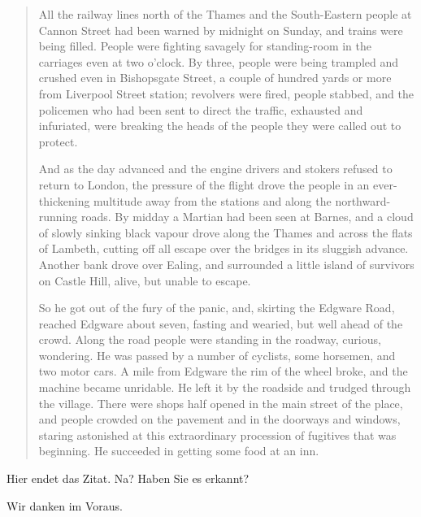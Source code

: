 \documentclass[12pt,ngerman,latin9,a4paper]{g-brief-ntz39lg19_exp}
\begin{document}
\begin{g-brief}
\begin{quote}
All the railway lines north of the Thames and the South-Eastern people at Cannon Street had been warned by midnight on Sunday, and trains were being filled.  People were fighting savagely for standing-room in the carriages even at two o'clock.  By three, people were being trampled and crushed even in Bishopsgate Street, a couple of hundred yards or more from Liverpool Street station; revolvers were fired, people stabbed, and the policemen who had been sent to direct the traffic, exhausted and infuriated, were breaking the heads of the people they were called out to protect.

And as the day advanced and the engine drivers and stokers refused to return to London, the pressure of the flight drove the people in an ever-thickening multitude away from the stations and along the northward-running roads.  By midday a Martian had been seen at Barnes, and a cloud of slowly sinking black vapour drove along the Thames and across the flats of Lambeth, cutting off all escape over the bridges in its sluggish advance.  Another bank drove over Ealing, and surrounded a little island of survivors on Castle Hill, alive, but unable to escape.

So he got out of the fury of the panic, and, skirting the Edgware Road, reached Edgware about seven, fasting and wearied, but well ahead of the crowd.  Along the road people were standing in the roadway, curious, wondering.  He was passed by a number of cyclists, some horsemen, and two motor cars.  A mile from Edgware the rim of the wheel broke, and the machine became unridable.  He left it by the roadside and trudged through the village.  There were shops half opened in the main street of the place, and people crowded on the pavement and in the doorways and windows, staring astonished at this extraordinary procession of fugitives that was beginning.  He succeeded in getting some food at an inn.
\end{quote}

Hier endet das Zitat. Na? Haben Sie es erkannt?

Wir danken im Voraus.

\end{g-brief}
\end{document}
